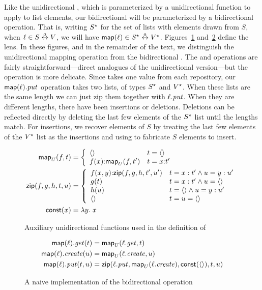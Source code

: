 Like the unidirectional \map, which is parameterized by a unidirectional
function to apply to list elements, our bidirectional \map will be
parameterized by a bidirectional operation. That is, writing $S^\star$ for
the set of lists with elements drawn from $S$, when $\ell \in S \overset{a}{\leftrightarrow} V$,
we will have $\mathsf{map}(\ell) \in S^\star \overset{a}{\leftrightarrow} V^\star$.
Figures~\ref{fig:uni-map-zip-const} and~\ref{fig:naive-asymmetric-map}
define the \map lens. In these figures, and in the remainder of the text, we
distinguish the unidirectional mapping operation \mapU from the
bidirectional \map. The \GET and \CREATE operations are fairly
straightforward---direct analogues of the unidirectional version---but the
\PUT operation is more delicate. Since \PUT takes one value from each
repository, our $\mathsf{map}(\ell).\mathit{put}$ operation takes two lists, of types
$S^\star$ and $V^\star$. When these lists are the same length we can just zip
them together with $\ell.\mathit{put}$. When they are different lengths, there have
been insertions or deletions. Deletions can be reflected directly by
deleting the last few elements of the $S^\star$ list until the lengths match.
For insertions, we recover elements of $S$ by treating the last few elements
of the $V^\star$ list as the insertions and using \CREATE to fabricate $S$
elements to insert.
\begin{figure}
    \begin{align*}
        \mathsf{map}_U(f,t) &= \left\{\begin{array}{ll}
            \left<\right> & t = \left<\right> \\
            f(x) \mathord{:} \mathsf{map}_U(f,t') & t = x \mathord{:} t'
        \end{array}\right. \\
        \mathsf{zip}(f,g,h,t,u) &= \left\{\begin{array}{ll}
            f(x,y) \mathord{:} \mathsf{zip}(f,g,h,t',u') & t = x:t' \land u = y:u' \\
            g(t) & t = x:t' \land u = \left<\right> \\
            h(u) & t = \left<\right> \land u = y:u' \\
            \left<\right> & t = u = \left<\right>
        \end{array}\right. \\
        \mathsf{const}(x) &= \lambda y.\;x
    \end{align*}
    \caption{Auxiliary unidirectional functions used in the definition of \map}
    \label{fig:uni-map-zip-const}
\end{figure}
\begin{figure}
    \begin{align*}
        \mathsf{map}(\ell).\mathit{get}(t) &= \mathsf{map}_U(\ell.\mathit{get},t) \\
        \mathsf{map}(\ell).\mathit{create}(u) &= \mathsf{map}_U(\ell.\mathit{create},u) \\
        \mathsf{map}(\ell).\mathit{put}(t,u) &=
            \mathsf{zip}(\ell.\mathit{put},\mathsf{map}_U(\ell.\mathit{create}),\mathsf{const}(\left<\right>),t,u)
    \end{align*}
    \caption{A naive implementation of the bidirectional \map operation}
    \label{fig:naive-asymmetric-map}
\end{figure}

